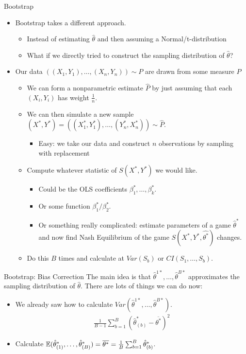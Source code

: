 \begin{frame}{Bootstrap}
\begin{itemize}
\item Bootstrap takes a different approach.
\begin{itemize}
\item Instead of estimating $\hat{\theta}$ and then assuming a Normal/t-distribution
\item What if we directly tried to construct the \alert{sampling distribution} of $\hat{\theta}$?
\end{itemize}
\item Our data $((X_1,Y_1),\ldots,(X_n,Y_n)) \sim P$ are drawn from some measure $P$
\begin{itemize}
\item We can form a \alert{nonparametric estimate} $\hat{P}$ by just assuming that each $(X_i,Y_i)$ has weight $\frac{1}{n}$.
\item We can then simulate a new sample $(X^{*},Y^{*}) = ((X_1^{*},Y_1^{*}),\ldots, (Y_n^{*}, X_n^{*})) \sim \hat{P}$.
\begin{itemize}
\item Easy: we take our data and construct $n$ observations by \alert{sampling with replacement} 
\end{itemize}
\item Compute whatever statistic of $S(X^*,Y^*)$ we would like.
\begin{itemize}
\item Could be the OLS coefficients $\beta_1^{*},\ldots, \beta_k^{*}$.
\item Or some function $\beta_1^{*}/\beta_2^{*}$.
\item Or something really complicated: estimate parameters of a game $\hat{\theta}^*$ and now find Nash Equilibrium of the game $S(X^{*},Y^{*},\hat{\theta^*})$ changes.
\end{itemize}
\item Do this $B$ times and calculate at $Var(S_b)$ or $CI(S_1,\ldots, S_b)$.
\end{itemize}
\end{itemize}
\end{frame}


\begin{frame}{Bootstrap: Bias Correction}
\small
The main idea is that $\hat{\theta}^{1*},\ldots, \hat{\theta}^{B*}$ approximates the \alert{sampling distribution} of $\hat{\theta}$. There are lots of things we can do now:
\begin{itemize}
\item We already saw how to calculate $Var(\hat{\theta}^{1*},\ldots, \hat{\theta}^{B*})$.
\begin{eqnarray*}
\frac{1}{B-1} \sum_{b=1}^B (\hat{\theta}_{(b)}^* - \overline{\theta^{*}})^2
\end{eqnarray*}
\item Calculate $\mathbb{E}(\hat{\theta}^{*}_{(1)},\ldots, \hat{\theta}^{*}_{(B)}) = \overline{\theta^{*}} = \frac{1}{B} \sum_{b=1}^B \hat{\theta}_{(b)}^*$.
\end{itemize}
\end{frame}

